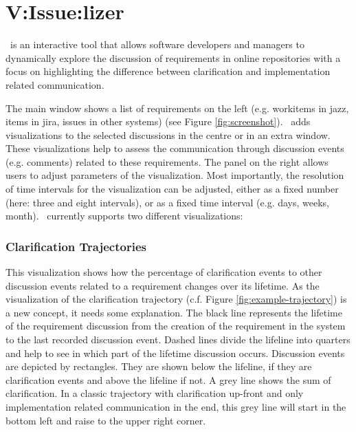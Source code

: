 \section{V:Issue:lizer}


\viss\ is an interactive tool that allows software developers and managers to dynamically explore the discussion of requirements  in online repositories with a focus on highlighting the difference between clarification and implementation related communication.


The main window shows a list of requirements on the  left (e.g. workitems in jazz, items in jira, issues in other systems) (see Figure \ref{fig:screenshot}).
\viss\ adds visualizations to the selected discussions in the centre or in an extra window. 
These visualizations help to assess the communication through discussion events (e.g. comments) related to these requirements.
The panel on the right allows users to adjust parameters of the visualization.
Most importantly, the resolution of time intervals for the visualization can be adjusted, either as a fixed number (here: three and eight intervals), or as a fixed time interval (e.g. days, weeks, month).
%
\viss\ currently supports two different visualizations: 

\subsubsection{Clarification Trajectories} 
This visualization shows how the percentage of clarification events to other discussion events related to a requirement changes over its lifetime.
As the visualization of the clarification trajectory (c.f. Figure \ref{fig:example-trajectory}) is a new concept, it needs some explanation.
The black line represents the lifetime of the requirement discussion from the creation of the requirement in the system to the last recorded discussion event.
Dashed lines divide the lifeline into quarters and help to see in which part of the lifetime discussion occurs.
Discussion events are depicted by rectangles.
They are shown below the lifeline, if they are clarification events and above the lifeline if not.
A grey line shows the sum of clarification.
In a classic trajectory with clarification up-front and only implementation related communication in the end, this grey line will start in the bottom left and raise to the upper right corner.


